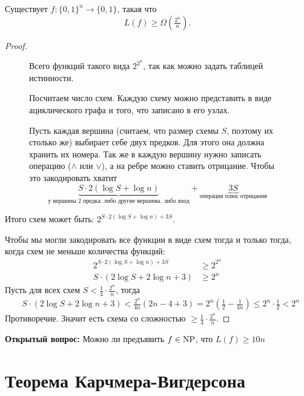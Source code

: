 \begin{thm}[Шеннон]
	Существует $ f \colon \{0, 1\}^{n} \to  \{0, 1\}$, такая что 
	$$ L(f) \ge \Omega\left( \tfrac{2^{n}}{n} \right) .$$
\end{thm}
\begin{proof}
\begin{figure}[h]
	\begin{minipage}{0.7\textwidth}
    Всего функций такого вида $ 2^{2^{n}}$, так как можно задать таблицей истинности.

	Посчитаем число схем. Каждую схему можно представить в виде ациклического графа и того, что записано в его узлах.

	Пусть каждая вершина (считаем, что размер схемы $ S$, поэтому их столько же) выбирает себе двух предков. Для этого она должна хранить их номера. 
	Так же в каждую вершину нужно записать операцию ($ \land$ или $ \lor$), а на ребре можно ставить отрицание. Чтобы это закодировать хватит 
	$$
	\underbrace{S \cdot 2 ( \log S + \log n)}_{\text{у вершины 2 предка: либо другие вершины, либо вход}} + \underbrace{3S}_{\text{операция плюс отрицания}}
	$$
	\end{minipage}
	\begin{minipage}{0.27\textwidth}
		\centering
		\label{fig:scheme-hard}
	\end{minipage}
\end{figure}

	Итого схем может быть: $2^{ S \cdot 2 (\log S + \log n) + 3S}$.

	Чтобы мы могли закодировать все функции в виде схем тогда и только тогда, когда 
	схем не меньше  количества функций:
	\begin{align*}
		2^{S \cdot  2( \log S + \log n) + 3S} &\ge  2^{2^n} \\
		S \cdot  ( 2\log S + 2\log n + 3)&\ge  2^n 
	\end{align*}
	Пусть для всех схем $S < \frac{1}{4}\cdot\frac{2^n}{n}$, тогда 
	\begin{align*}
	    &S\cdot(2\log S + 2 \log n + 3) < \frac{2^n}{4n}(2n - 4 + 3) = 2^n\left(\frac{1}{2} - \frac{1}{4n}\right) \le 2^n \cdot \frac{1}{2} < 2^n
	\end{align*}
	Противоречие. Значит есть схема со сложностью $\ge \frac{1}{4}\cdot\frac{2^n}{n}$.
\end{proof}

\textbf{Открытый вопрос:} Можно ли предъявить $ f \in \operatorname{NP}$, что $ L(f) \ge  10n$


\section{Теорема Карчмера-Вигдерсона}

